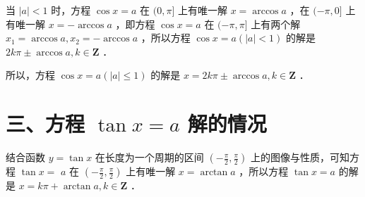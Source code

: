 \documentclass[10pt]{article}
\begin{document}
当 \(|a|<1\) 时，方程 \(\cos x=a\) 在 \((0, \pi]\) 上有唯一解 \(x=\arccos a\) ，在 \((-\pi, 0]\) 上有唯一解 \(x=-\arccos a\) ，即方程 \(\cos x=a\) 在 \((-\pi, \pi]\) 上有两个解 \(x_{1}=\arccos a, x_{2}=-\arccos a\) ，所以方程 \(\cos x=a(|a|<1)\) 的解是 \(2 k \pi \pm \arccos a, k \in \mathbf{Z}\) ．

所以，方程 \(\cos x=a(|a| \leqslant 1)\) 的解是 \(x=2 k \pi \pm \arccos a, k \in \mathbf{Z}\) ．

\section*{三、方程 \(\tan x=a\) 解的情况}
结合函数 \(y=\tan x\) 在长度为一个周期的区间 \(\left(-\frac{\pi}{2}, \frac{\pi}{2}\right)\) 上的图像与性质，可知方程 \(\tan x=\) \(a\) 在 \(\left(-\frac{\pi}{2}, \frac{\pi}{2}\right)\) 上有唯一解 \(x=\arctan a\) ，所以方程 \(\tan x=a\) 的解是 \(x=k \pi+\arctan a, k \in \mathbf{Z}\) ．
\end{document}

